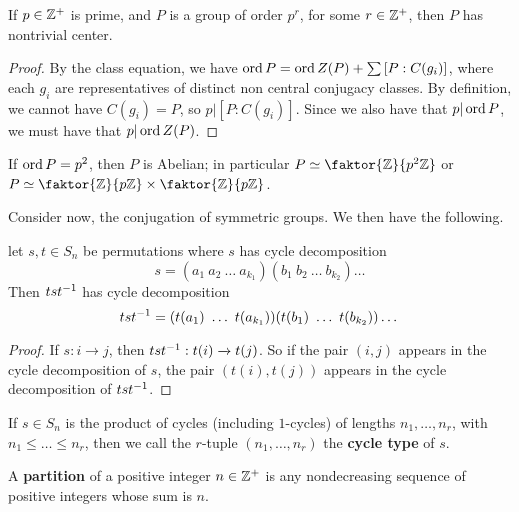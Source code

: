 \begin{theorem}\label{theorem_4.3.3}
  If $p \in \mathbb{Z}^+$ is prime, and $P$ is a group of order $p^r$, for some  $r
  \in \mathbb{Z}^+$, then $P$ has nontrivial center.
\end{theorem}
\begin{proof}
  By the class equation, we have $\operatorname{ord}{P}=\operatorname{ord}{Z(P)}+\sum{[P:C(g_i)]}$, where
  each $g_i$ are representatives of distinct non central conjugacy classes. By
  definition, we cannot have $C(g_i)=P$, so $p|[P:C(g_i)]$. Since we also have
  that $p|\operatorname{ord}{P}$, we must have that $p|\operatorname{ord}{Z(P)}$.
\end{proof}
\begin{corollary}
  If $\operatorname{ord}{P}=p^2$, then $P$ is Abelian; in particular  $P \simeq
  \faktor{\Z}{p^2\Z}$ or $P \simeq \faktor{\Z}{p\Z} \times \faktor{\Z}{p\Z}$.
\end{corollary}

Consider now, the conjugation of symmetric groups. We then have the following.

\begin{lemma}\label{lemma_4.3.4}
  let $s,t \in S_n$ be permutations where $s$ has cycle decomposition
  \begin{equation*}
    s=(a_1 \ a_2 \ \dots \ a_{k_1})(b_1 \ b_2 \ \dots \ b_{k_2})\dots
  \end{equation*}
  Then $tst^{-1}$ has cycle decomposition
  \begin{equation*}
    ts\inv{t}=(t(a_1) \ \dots \ t(a_{k_1}))(t(b_1) \ \dots \ t(b_{k_2}))\dots
  \end{equation*}
\end{lemma}
\begin{proof}
  If $s:i \xrightarrow{} j$, then $tst^{-1}:t(i) \xrightarrow{} t(j)$. So if
  the pair $(i,j)$ appears in the cycle decomposition of $s$, the pair
  $(t(i),t(j))$ appears in the cycle decomposition of $tst^{-1}$.
\end{proof}

\begin{definition}
  If $s \in S_n$ is the product of cycles (including $1$-cycles) of lengths
  $n_1, \dots, n_r$, with $n_1 \leq \dots \leq n_r$, then we call the $r$-tuple
  $(n_1, \dots, n_r)$ the \textbf{cycle type} of $s$.
\end{definition}

\begin{definition}
  A \textbf{partition} of a positive integer $n \in \mathbb{Z}^+$ is any nondecreasing
  sequence of positive integers whose sum is $n$.
\end{definition}

